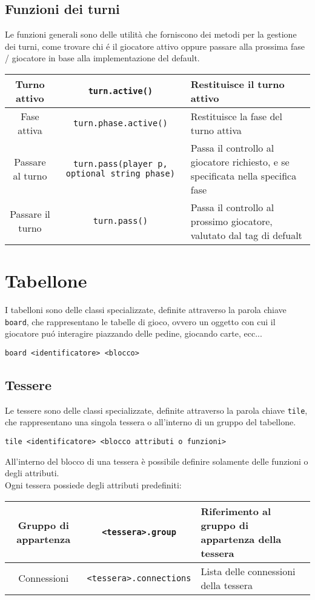 \subsection{Funzioni dei turni}
Le funzioni generali sono delle utilità che forniscono dei metodi per la gestione
dei turni, come trovare chi é il giocatore attivo oppure passare alla prossima 
fase / giocatore in base alla implementazione del default. \\

\begin{tabular}{|c|c|p{5cm}|}
   \hline 
   Turno attivo & \lstinline|turn.active()| & Restituisce il turno attivo \\
   \hline
   Fase attiva & \lstinline|turn.phase.active()| & Restituisce la fase del turno attiva \\
   \hline
   Passare al turno & \lstinline|turn.pass(player p, optional string phase)| & 
   Passa il controllo al giocatore richiesto, 
   e se specificata nella specifica fase \\
   \hline
   Passare il turno & \lstinline|turn.pass()| & Passa il controllo al prossimo giocatore, valutato dal tag di defualt \\
   \hline 
\end{tabular}

\section{Tabellone}
I tabelloni sono delle classi specializzate, definite attraverso la parola chiave \lstinline|board|,
che rappresentano le tabelle di gioco, ovvero un oggetto con cui
il giocatore puó interagire piazzando delle pedine, giocando carte, ecc... \\ 
\begin{lstlisting}
board <identificatore> <blocco>
\end{lstlisting}

\subsection{Tessere}
Le tessere sono delle classi specializzate, definite attraverso la parola chiave \lstinline|tile|,
che rappresentano una singola tessera o all'interno di un gruppo del tabellone. \\
\begin{lstlisting}
tile <identificatore> <blocco attributi o funzioni>
\end{lstlisting}
All'interno del blocco di una tessera è possibile definire solamente delle funzioni o degli attributi. \\ 
Ogni tessera possiede degli attributi predefiniti:
\begin{center}
\begin{tabular}{|c|c|p{5cm}|}
    \hline 
    Gruppo di appartenza & \lstinline|<tessera>.group| & Riferimento al gruppo di appartenza della tessera \\ 
    \hline
    Connessioni & \lstinline|<tessera>.connections| & Lista delle connessioni della tessera \\
    \hline 
\end{tabular}
\end{center}


